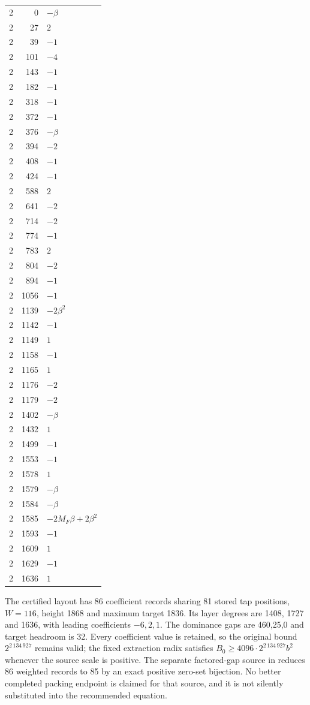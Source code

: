 \begin{longtable}{rrl}
2 & 0 & $- \beta$\\
2 & 27 & $2$\\
2 & 39 & $-1$\\
2 & 101 & $-4$\\
2 & 143 & $-1$\\
2 & 182 & $-1$\\
2 & 318 & $-1$\\
2 & 372 & $-1$\\
2 & 376 & $- \beta$\\
2 & 394 & $-2$\\
2 & 408 & $-1$\\
2 & 424 & $-1$\\
2 & 588 & $2$\\
2 & 641 & $-2$\\
2 & 714 & $-2$\\
2 & 774 & $-1$\\
2 & 783 & $2$\\
2 & 804 & $-2$\\
2 & 894 & $-1$\\
2 & 1056 & $-1$\\
2 & 1139 & $- 2 \beta^{2}$\\
2 & 1142 & $-1$\\
2 & 1149 & $1$\\
2 & 1158 & $-1$\\
2 & 1165 & $1$\\
2 & 1176 & $-2$\\
2 & 1179 & $-2$\\
2 & 1402 & $- \beta$\\
2 & 1432 & $1$\\
2 & 1499 & $-1$\\
2 & 1553 & $-1$\\
2 & 1578 & $1$\\
2 & 1579 & $- \beta$\\
2 & 1584 & $- \beta$\\
2 & 1585 & $- 2 M_{F} \beta + 2 \beta^{2}$\\
2 & 1593 & $-1$\\
2 & 1609 & $1$\\
2 & 1629 & $-1$\\
2 & 1636 & $1$\\
\bottomrule\end{longtable}
The certified layout has 86 coefficient records sharing 81 stored tap
positions, $W=116$, height 1868 and maximum target 1836.
Its layer degrees are 1408, 1727 and 1636, with leading coefficients
$-6,2,1$. The dominance gaps are 460,25,0 and target headroom is 32.
Every coefficient value is retained, so the original bound
$2^{2\,134\,927}$ remains valid; the fixed extraction radix satisfies
$B_0\ge4096\cdot2^{2\,134\,927}b^2$ whenever the source scale is positive.
The separate factored-gap source in 
reduces 86 weighted records to 85 by an exact positive zero-set bijection.
No better completed packing endpoint is claimed for that source, and it
is not silently substituted into the recommended equation.
